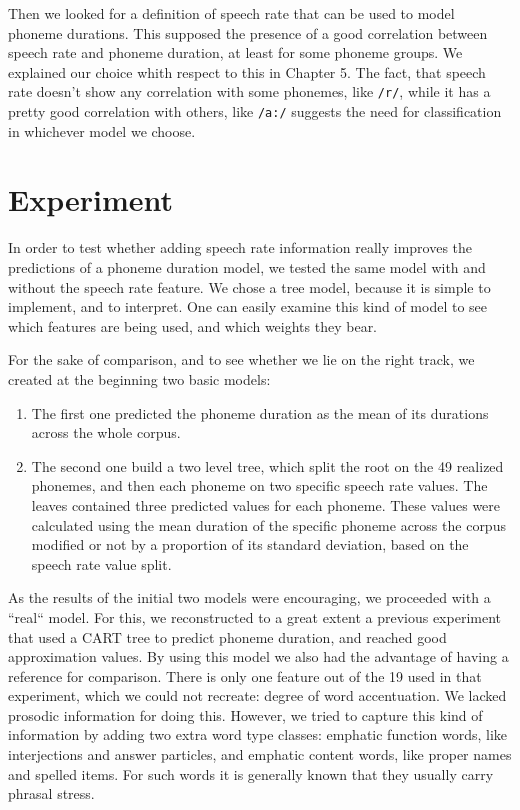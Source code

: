 \documentclass[11pt,a4paper]{scrbook}
\begin{document}
Then we looked for a definition of speech rate that can be used to model phoneme durations. This supposed the presence of a good correlation between speech rate and phoneme duration, at least for some phoneme groups. We explained our choice whith respect to this in Chapter 5. 
The fact, that speech rate doesn't show any correlation with some phonemes, like \texttt{/r/}, while it has a pretty good correlation with others, like \texttt{/a:/} suggests the need for classification in whichever model we choose.

\section{Experiment}
In order to test whether adding speech rate information really improves the predictions of a phoneme duration model, we tested the same model with and without the speech rate feature. We chose a tree model, because it is simple to implement, and to interpret. One can easily examine this kind of model to see which features are being used, and which weights they bear. 

For the sake of comparison, and to see whether we lie on the right track, we created at the beginning two basic models: 

\begin{enumerate}
	\item The first one predicted the phoneme duration as the mean of its durations across the whole corpus. 
	\item The second one build a two level tree, which split the root on the 49 realized phonemes, and then each phoneme on two specific speech rate values. The leaves contained three predicted values for each phoneme. These values were calculated using the mean duration of the specific phoneme across the corpus modified or not by a proportion of its standard deviation, based on the speech rate value split. 
\end{enumerate}

As the results of the initial two models were encouraging, we proceeded with a ``real`` model. For this, we reconstructed to a great extent a previous experiment \cite{Brinckmann_2003} that used a CART tree to predict phoneme duration, and reached good approximation values. By using this model we also had the advantage of having a reference for comparison. There is only one feature out of the 19 used in that experiment, which we could not recreate: degree of word accentuation. We lacked prosodic information for doing this. However, we tried to capture this kind of information by adding two extra word type classes: emphatic function words, like interjections and answer particles, and emphatic content words, like proper names and spelled items. For such words it is generally known that they usually carry phrasal stress.
\end{document}
